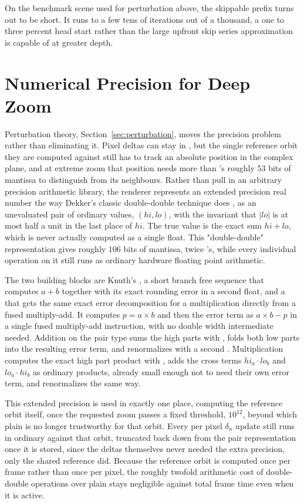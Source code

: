 \documentclass{ftndiplomski}
\begin{document}
On the benchmark scene used for perturbation above, the skippable prefix turns out to be short. It
runs to a few tens of iterations out of a thousand, a one to three percent head start rather than
the large upfront skip series approximation is capable of at greater depth.

\section{Numerical Precision for Deep Zoom}
\label{sec:precision}

Perturbation theory, Section~\ref{sec:perturbation}, moves the precision problem rather than
eliminating it. Pixel deltas can stay in , but the single reference orbit they are
computed against still has to track an absolute position in the complex plane, and at extreme zoom
that position needs more than 's roughly $53$ bits of mantissa to distinguish from its
neighbours. Rather than pull in an arbitrary precision arithmetic library, the renderer represents
an extended precision real number the way Dekker's classic double-double technique does
\cite{dekker1971}, as an unevaluated pair of ordinary  values, $(hi, lo)$, with the
invariant that $|lo|$ is at most half a unit in the last place of $hi$. The true value is the exact
sum $hi + lo$, which is never actually computed as a single float. This "double-double"
representation gives roughly $106$ bits of mantissa, twice 's, while every individual
operation on it still runs as ordinary hardware floating point arithmetic.

The two building blocks are Knuth's  \cite{knuth1997seminumerical}, a short branch
free sequence that computes $a+b$ together with its exact rounding error in a second float, and a
 \cite{ogitarumpoishi2005} that gets the same exact error decomposition for a
multiplication directly from a fused multiply-add. It computes $p = a \times b$ and then the error
term as $a \times b - p$ in a single fused multiply-add instruction, with no double width
intermediate needed. Addition on the pair type sums the high parts with , folds both
low parts into the resulting error term, and renormalizes with a second .
Multiplication computes the exact high part product with , adds the cross terms
$hi_a \cdot lo_b$ and $lo_a \cdot hi_b$ as ordinary  products, already small enough not to
need their own error term, and renormalizes the same way.

This extended precision is used in exactly one place, computing the reference orbit itself, once
the requested zoom passes a fixed threshold, $10^{12}$, beyond which plain  is no longer
trustworthy for that orbit. Every per pixel $\delta_n$ update still runs in ordinary 
against that orbit, truncated back down from the pair representation once it is stored, since the
deltas themselves never needed the extra precision, only the shared reference did. Because the
reference orbit is computed once per frame rather than once per pixel, the roughly twofold
arithmetic cost of double-double operations over plain  stays negligible against total
frame time even when it is active.
\end{document}
